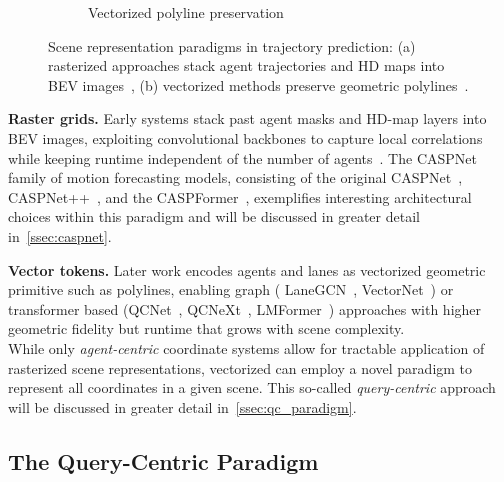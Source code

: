 \begin{figure}[H]
\begin{subfigure}[t]{0.37\textwidth}
    \caption{Vectorized polyline preservation}
    \label{fig:vectorized}
\end{subfigure}
\caption{Scene representation paradigms in trajectory prediction: (a) rasterized approaches stack agent trajectories and HD maps into BEV images~\cite{caspnetSchäfer2022}, (b) vectorized methods preserve geometric polylines~\cite{gao2020vectornet}.}
\label{fig:scene_representations}
\end{figure}

\textbf{Raster grids.} Early systems stack past agent masks and HD-map layers into BEV images, exploiting convolutional backbones to capture local correlations while keeping runtime independent of the number of agents~\cite{cui2019multimodal,chai2019multipath}. The CASPNet family of motion forecasting models, consisting of the original CASPNet~\cite{caspnetSchäfer2022}, CASPNet++~\cite{caspnetppSchäfer2023}, and the CASPFormer~\cite{caspformerYadav2024}, exemplifies interesting architectural choices within this paradigm and will be discussed in greater detail in~\autoref{ssec:caspnet}.

\textbf{Vector tokens.} Later work encodes agents and lanes as vectorized geometric primitive such as polylines, enabling graph ( LaneGCN~\cite{liang2020learning}, VectorNet~\cite{gao2020vectornet}) or transformer based (QCNet~\cite{qcnetZhou2023}, QCNeXt~\cite{qcnextZhou2023}, LMFormer~\cite{lmformerYadav2025}) approaches with higher geometric fidelity but runtime that grows with scene complexity.\\
While only \emph{agent-centric} coordinate systems allow for tractable application of rasterized scene representations, vectorized can employ a novel paradigm to represent all coordinates in a given scene. This so-called \emph{query-centric} approach will be discussed in greater detail in~\autoref{ssec:qc_paradigm}.


\subsection{The Query-Centric Paradigm}
\label{ssec:qc_paradigm}

\newpage